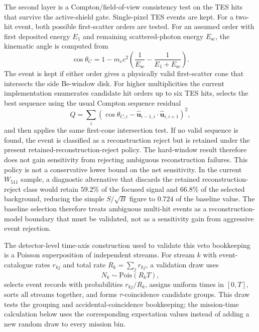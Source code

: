 \documentclass[preprint,12pt]{elsarticle}
\newcommand{\wii}{W_{511}}
\begin{document}
The second layer is a Compton/field-of-view consistency test on the TES hits
that survive the active-shield gate. Single-pixel TES events are kept. For a
two-hit event, both possible first-scatter orders are tested. For an assumed
order with first deposited energy $E_1$ and remaining scattered-photon energy
$E_{\mathrm{sc}}$, the kinematic angle is computed from
\begin{equation}
  \cos\theta_C =
  1 - m_ec^2\left(\frac{1}{E_{\mathrm{sc}}}
  - \frac{1}{E_1+E_{\mathrm{sc}}}\right).
\end{equation}
The event is kept if either order gives a physically valid first-scatter cone
that intersects the side Be-window disk. For higher multiplicities the current
implementation enumerates candidate hit orders up to six TES hits, selects the
best sequence using the usual Compton sequence residual
\begin{equation}
  Q = \sum_i
  \left(\cos\theta_{C,i} -
  \hat{\mathbf u}_{i-1,i}\cdot\hat{\mathbf u}_{i,i+1}\right)^2,
\end{equation}
and then applies the same first-cone intersection test. If no valid sequence is
found, the event is classified as a reconstruction reject but is retained under
the present retained-reconstruction-reject policy. The hard-window result therefore does not gain
sensitivity from rejecting ambiguous reconstruction failures.
This policy is not a conservative lower bound on the net sensitivity. In the
current $\wii$ sample, a diagnostic alternative that discards the
retained reconstruction-reject class would retain $59.2\%$ of the focused signal and
$66.8\%$ of the selected background, reducing the simple $S/\sqrt{B}$ figure
to $0.724$ of the baseline value. The baseline selection therefore treats
ambiguous multi-hit events as a reconstruction-model boundary that must be
validated, not as a sensitivity gain from aggressive event rejection.

The detector-level time-axis construction used to validate this veto bookkeeping
is a Poisson superposition of independent streams. For stream $k$ with
event-catalogue rates $r_{kj}$ and total rate $R_k=\sum_j r_{kj}$, a validation
draw uses
\begin{equation}
  N_k\sim \mathrm{Pois}(R_k T),
\end{equation}
selects event records with probabilities $r_{kj}/R_k$, assigns uniform times in
$[0,T]$, sorts all streams together, and forms $\tau$-coincidence candidate
groups. This draw tests the grouping and accidental-coincidence bookkeeping;
the mission-time calculation below uses the corresponding expectation values
instead of adding a new random draw to every mission bin.
\end{document}
